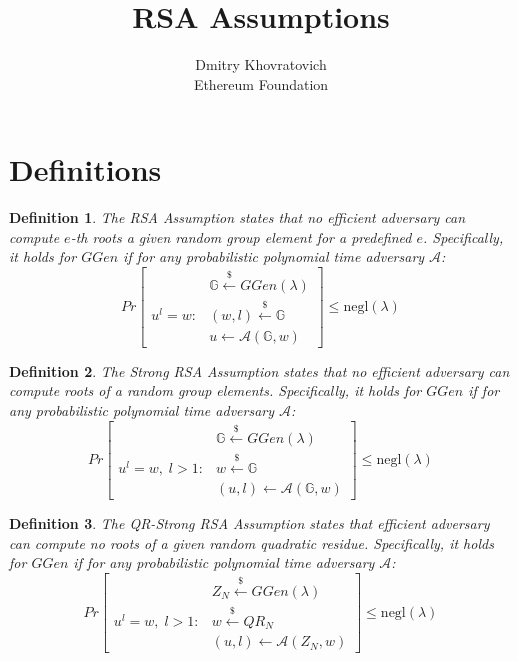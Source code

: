 \documentclass[a4paper]{article}
\title{RSA Assumptions}
\author{Dmitry Khovratovich\\Ethereum Foundation}
\newtheorem{definition}{Definition}
\begin{document}
\maketitle

\section{Definitions}

\begin{definition}
The \emph{RSA Assumption} states that no
efficient adversary can compute $e$-th roots a given random group element for a predefined $e$. Specifically,
it holds for $GGen$ if for any probabilistic polynomial time adversary $\mathcal{A}$:
$$
Pr
\begin{bmatrix}
&\mathbb{G}\xleftarrow{\$}GGen(\lambda)\\
u^l = w :
& (w,l)\xleftarrow{\$}\mathbb{G}\\
&u \xleftarrow{} \mathcal{A}(\mathbb{G},w)
\end{bmatrix}\leq \mathrm{negl}(\lambda)
$$
\end{definition}

\begin{definition}
The \emph{Strong RSA Assumption} states that no
efficient adversary can compute roots of a random group elements. Specifically,
it holds for $GGen$ if for any probabilistic polynomial time adversary $\mathcal{A}$:
$$
Pr
\begin{bmatrix}
&\mathbb{G}\xleftarrow{\$}GGen(\lambda)\\
u^l = w,\; l>1 :
& w\xleftarrow{\$}\mathbb{G}\\
&(u,l) \xleftarrow{} \mathcal{A}(\mathbb{G},w)
\end{bmatrix}\leq \mathrm{negl}(\lambda)
$$
\end{definition}

\begin{definition}
The \emph{QR-Strong RSA Assumption} states that 
efficient adversary can compute no roots of a given random quadratic residue. Specifically,
it holds for $GGen$ if for any probabilistic polynomial time adversary $\mathcal{A}$:
$$
Pr
\begin{bmatrix}
&Z_N\xleftarrow{\$}GGen(\lambda)\\
u^l = w,\; l>1 :
& w\xleftarrow{\$}QR_N\\
&(u,l) \xleftarrow{} \mathcal{A}(Z_N,w)
\end{bmatrix}\leq \mathrm{negl}(\lambda)
$$
\end{definition}
\end{document}

